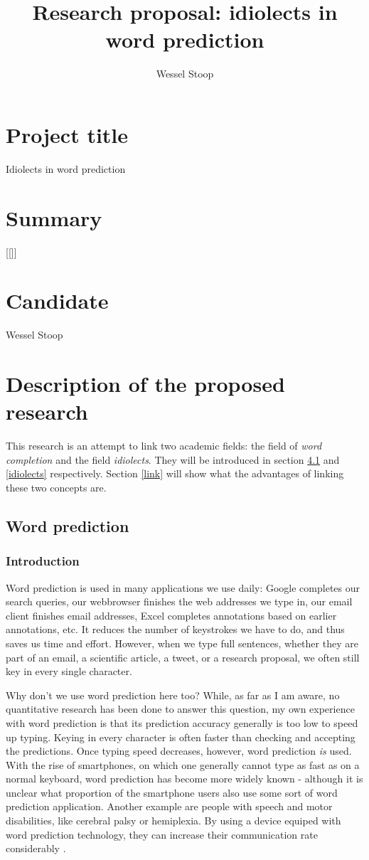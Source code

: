 \documentclass[12pt]{article}
\title{Research proposal: idiolects in word prediction}
\author{Wessel Stoop}
\begin{document}
\section{Project title}
Idiolects in word prediction

\section{Summary}
[[]]

\section{Candidate}
Wessel Stoop

\section{Description of the proposed research}

This research is an attempt to link two academic fields: the field of \emph{word completion} and the field \emph{idiolects}. They will be introduced in section \ref{wordprediction} and \ref{idiolects} respectively. Section \ref{link} will show what the advantages of linking these two concepts are.

\subsection{Word prediction} \label{wordprediction}

\subsubsection{Introduction}

Word prediction is used in many applications we use daily: Google completes our search queries, our webbrowser finishes the web addresses we type in, our email client finishes email addresses, Excel completes annotations based on earlier annotations, etc. It reduces the number of keystrokes we have to do, and thus saves us time and effort. However, when we type full sentences, whether they are part of an email, a scientific article, a tweet, or a research proposal, we often still key in every single character. 

Why don't we use word prediction here too? While, as far as I am aware, no quantitative research has been done to answer this question, my own experience with word prediction is that its prediction accuracy generally is too low to speed up typing. Keying in every character is often faster than checking and accepting the predictions. Once typing speed decreases, however, word prediction \emph{is} used. With the rise of smartphones,  on which one generally cannot type as fast as on a normal keyboard, word prediction has become more widely known - although it is unclear what proportion of the smartphone users also use some sort of word prediction application. Another example are  people with speech and motor disabilities, like cerebral palsy or hemiplexia. By using a device equiped with word prediction technology, they can increase their communication rate considerably \cite{Garay-Vitoria}.
\end{document}
